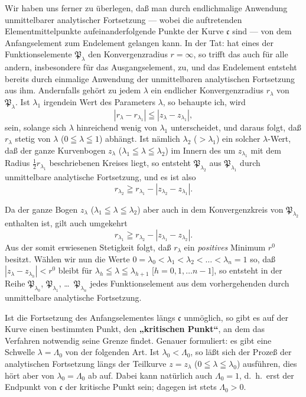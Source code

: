 \documentclass{article}
\begin{document}
Wir haben uns ferner zu überlegen, daß man durch endlichmalige Anwendung unmittelbarer analytischer Fortsetzung --- wobei die auftretenden Elementmittelpunkte aufeinanderfolgende Punkte der Kurve $\mathfrak{c}$ sind --- von dem Anfangselement zum Endelement gelangen kann. In der Tat: hat eines der Funktionselemente $\mathfrak{P}_\lambda$ den Konvergenzradius $r = \infty$, so trifft das auch für alle andern, insbesondere für das Ausgangselement, zu, und das Endelement entsteht bereits durch einmalige Anwendung der unmittelbaren analytischen Fortsetzung aus ihm. Andernfalls gehört zu jedem $\lambda$ ein endlicher Konvergenzradius $r_\lambda$ von $\mathfrak{P}_\lambda$. Ist $\lambda_1$ irgendein Wert des Parameters $\lambda$, so behaupte ich, wird
\[ |r_\lambda - r_{\lambda_1}| \leqq |z_\lambda - z_{\lambda_1}|, \]
sein, solange sich $\lambda$ hinreichend wenig von $\lambda_1$ unterscheidet, und daraus folgt, daß $r_\lambda$ stetig von $\lambda$ ($0 \leqq \lambda \leqq 1$) abhängt. Ist nämlich $\lambda_2$ ($> \lambda_1$) ein solcher $\lambda$-Wert, daß der ganze Kurvenbogen $z_\lambda$ ($\lambda_1 \leqq \lambda \leqq \lambda_2$) im Innern des um $z_{\lambda_1}$ mit dem Radius $\frac{1}{2}r_{\lambda_1}$ beschriebenen Kreises liegt, so entsteht $\mathfrak{P}_{\lambda_2}$ aus $\mathfrak{P}_{\lambda_1}$ durch unmittelbare analytische Fortsetzung, und es ist also
\[ r_{\lambda_2} \geqq r_{\lambda_1} - |z_{\lambda_2} - z_{\lambda_1}|. \]

Da der ganze Bogen $z_\lambda$ ($\lambda_1 \leqq \lambda \leqq \lambda_2$) aber auch in dem Konvergenzkreis von $\mathfrak{P}_{\lambda_2}$ enthalten ist, gilt auch umgekehrt
\[ r_{\lambda_1} \geqq r_{\lambda_2} - |z_{\lambda_1} - z_{\lambda_2}|. \]
Aus der somit erwiesenen Stetigkeit folgt, daß $r_\lambda$ ein \emph{positives} Minimum $r^0$ besitzt. Wählen wir nun die Werte $0 = \lambda_0 < \lambda_1 < \lambda_2 < \dots < \lambda_n = 1$ so, daß $|z_\lambda - z_{\lambda_h}| < r^0$ bleibt für $\lambda_h \leqq \lambda \leqq \lambda_{h+1}$ [$h = 0, 1, \dots n-1$], so entsteht in der Reihe $\mathfrak{P}_{\lambda_0}$, $\mathfrak{P}_{\lambda_1}$, \dots\ $\mathfrak{P}_{\lambda_n}$ jedes Funktionselement aus dem vorhergehenden durch unmittelbare analytische Fortsetzung.

Ist die Fortsetzung des Anfangselementes längs $\mathfrak{c}$ unmöglich, so gibt es auf der Kurve einen bestimmten Punkt, den \textbf{„kritischen Punkt“}, an dem das Verfahren notwendig seine Grenze findet. Genauer formuliert: es gibt eine Schwelle $\lambda = \Lambda_0$ von der folgenden Art. Ist $\lambda_0 < \Lambda_0$, so läßt sich der Prozeß der analytischen Fortsetzung längs der Teilkurve $z = z_\lambda$ ($0 \leqq \lambda \leqq \lambda_0$) ausführen, dies hört aber von $\lambda_0 = \Lambda_0$ ab auf. Dabei kann natürlich auch $\Lambda_0 = 1$, d.\ h.\ erst der Endpunkt von $\mathfrak{c}$ der kritische Punkt sein; dagegen ist stets $\Lambda_0 > 0$.
\end{document}
